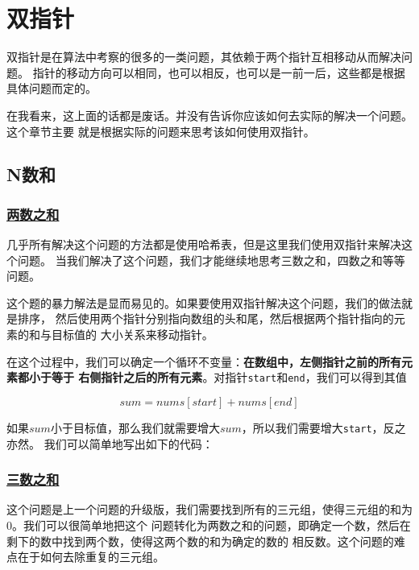 \documentclass[../../main.tex]{subfiles}
\begin{document}
\setchapterpreamble[u]{\margintoc}

\chapter{双指针}

双指针是在算法中考察的很多的一类问题，其依赖于两个指针互相移动从而解决问题。
指针的移动方向可以相同，也可以相反，也可以是一前一后，这些都是根据具体问题而定的。

在我看来，这上面的话都是废话。并没有告诉你应该如何去实际的解决一个问题。这个章节主要
就是根据实际的问题来思考该如何使用双指针。

\section{N数和}

\subsection{\href{https://leetcode-cn.com/problems/two-sum/}{两数之和}}

几乎所有解决这个问题的方法都是使用哈希表，但是这里我们使用双指针来解决这个问题。
当我们解决了这个问题，我们才能继续地思考三数之和，四数之和等等问题。

这个题的暴力解法是显而易见的。如果要使用双指针解决这个问题，我们的做法就是排序，
然后使用两个指针分别指向数组的头和尾，然后根据两个指针指向的元素的和与目标值的
大小关系来移动指针。

在这个过程中，我们可以确定一个循环不变量：\textbf{在数组中，左侧指针之前的所有元素都小于等于
右侧指针之后的所有元素}。对指针\verb|start|和\verb|end|，我们可以得到其值

$$
sum = nums[start] + nums[end]
$$

如果$sum$小于目标值，那么我们就需要增大$sum$，所以我们需要增大\verb|start|，反之亦然。
我们可以简单地写出如下的代码：



\subsection{\href{https://leetcode-cn.com/problems/3sum}{三数之和}}

这个问题是上一个问题的升级版，我们需要找到所有的三元组，使得三元组的和为0。我们可以很简单地把这个
问题转化为两数之和的问题，即确定一个数，然后在剩下的数中找到两个数，使得这两个数的和为确定的数的
相反数。这个问题的难点在于如何去除重复的三元组。
\end{document}
